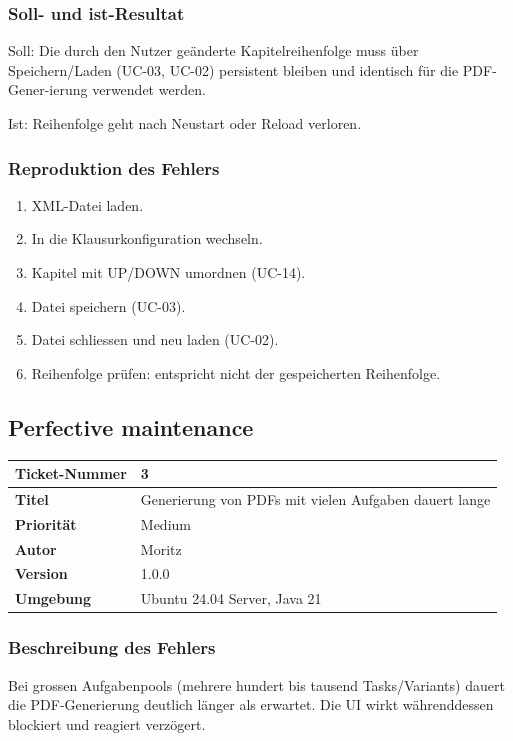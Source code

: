 \documentclass[a4paper]{article}
\begin{document}
\subsubsection*{Soll- und ist-Resultat}
Soll: Die durch den Nutzer geänderte Kapitelreihenfolge muss über Speichern/Laden (UC-03, UC-02) persistent bleiben und identisch für die PDF-Gener-ierung verwendet werden. 

Ist: Reihenfolge geht nach Neustart oder Reload verloren.

\subsubsection*{Reproduktion des Fehlers} 

\begin{enumerate}
    \item XML-Datei laden.
    \item In die Klausurkonfiguration wechseln.
    \item Kapitel mit UP/DOWN umordnen (UC-14).
    \item Datei speichern (UC-03).
    \item Datei schliessen und neu laden (UC-02).
    \item Reihenfolge prüfen: entspricht nicht der gespeicherten Reihenfolge.
\end{enumerate}

\newpage
\subsection{Perfective maintenance}

\begin{center}
\begin{tabular}{|p{3cm}|p{8cm}|}
\hline
\textbf{Ticket-Nummer} & 3 \\
\hline
\textbf{Titel} & Generierung von PDFs mit vielen Aufgaben dauert lange \\
\hline
\textbf{Priorität} & Medium \\
\hline
\textbf{Autor} & Moritz \\
\hline
\textbf{Version} & 1.0.0 \\
\hline
\textbf{Umgebung} & Ubuntu 24.04 Server, Java 21 \\
\hline
\end{tabular}
\end{center}

\subsubsection*{Beschreibung des Fehlers}
Bei grossen Aufgabenpools (mehrere hundert bis tausend Tasks/Variants) dauert die PDF-Generierung deutlich länger als erwartet. Die UI wirkt währenddessen blockiert und reagiert verzögert.
\end{document}

